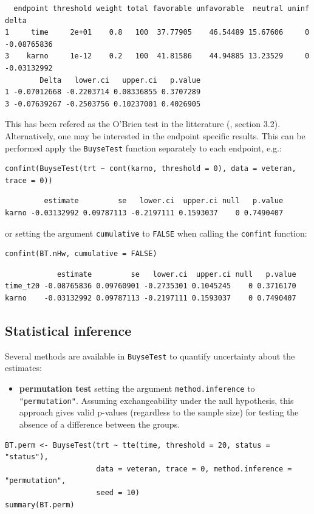 \documentclass[12pt]{article}
\begin{document}
\begin{verbatim}
  endpoint threshold weight total favorable unfavorable  neutral uninf       delta
1     time     2e+01    0.8   100  37.77905    46.54489 15.67606     0 -0.08765836
3    karno     1e-12    0.2   100  41.81586    44.94885 13.23529     0 -0.03132992
        Delta   lower.ci   upper.ci   p.value
1 -0.07012668 -0.2203714 0.08336855 0.3707289
3 -0.07639267 -0.2503756 0.10237001 0.4026905
\end{verbatim}


This has been refered as the O’Brien test in the litterature
(\cite{verbeeck2019generalized}, section 3.2). Alternatively, one may be
interested in the endpoint specific results. This can be performed
apply the \texttt{BuyseTest} function separately to each endpoint, e.g.:
\lstset{language=r,label= ,caption= ,captionpos=b,numbers=none}
\begin{lstlisting}
confint(BuyseTest(trt ~ cont(karno, threshold = 0), data = veteran, trace = 0))
\end{lstlisting}

\begin{verbatim}
         estimate         se   lower.ci  upper.ci null   p.value
karno -0.03132992 0.09787113 -0.2197111 0.1593037    0 0.7490407
\end{verbatim}


or setting the argument \texttt{cumulative} to \texttt{FALSE} when calling the
\texttt{confint} function:
\lstset{language=r,label= ,caption= ,captionpos=b,numbers=none}
\begin{lstlisting}
confint(BT.nHw, cumulative = FALSE)
\end{lstlisting}

\begin{verbatim}
            estimate         se   lower.ci  upper.ci null   p.value
time_t20 -0.08765836 0.09760901 -0.2735301 0.1045245    0 0.3716170
karno    -0.03132992 0.09787113 -0.2197111 0.1593037    0 0.7490407
\end{verbatim}


\clearpage

\subsection{Statistical inference}
\label{sec:org66c7161}

Several methods are available in \texttt{BuyseTest} to quantify uncertainty
about the estimates:
\begin{itemize}
\item \textbf{permutation test} setting the argument \texttt{method.inference} to
\texttt{"permutation"}. Assuming exchangeability under the null hypothesis,
this approach gives valid p-values (regardless to the sample size)
for testing the absence of a difference between the groups.
\end{itemize}
\lstset{language=r,label= ,caption= ,captionpos=b,numbers=none}
\begin{lstlisting}
BT.perm <- BuyseTest(trt ~ tte(time, threshold = 20, status = "status"),
                     data = veteran, trace = 0, method.inference = "permutation",
                     seed = 10) 
summary(BT.perm)
\end{lstlisting}
\end{document}
